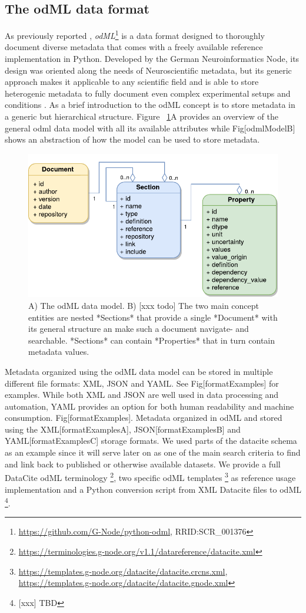 \documentclass{article}
\begin{document}
\subsection{The odML data format}
As previously reported \cite{Grewe_2011}, \textit{odML}\footnote{\url{https://github.com/G-Node/python-odml}, RRID:SCR\_001376} is a data format designed to thoroughly document diverse metadata that comes with a freely available reference implementation in Python. Developed by the German Neuroinformatics Node, its design was oriented along the needs of Neuroscientific metadata, but its generic approach makes it applicable to any scientific field and is able to store heterogenic metadata to fully document even complex experimental setups and conditions \cite{Zehl_2016}.
As a brief introduction to the odML concept is to store metadata in a generic but hierarchical structure. Figure ~\ref{fig:odmlModel}A provides an overview of the general odml data model with all its available attributes while Fig[odmlModelB] shows an abstraction of how the model can be used to store metadata.

\begin{figure}
\begin{center}
\includegraphics[width=0.70\columnwidth]{figures/figOdmlModelA.pdf}
\caption{
A) The odML data model. B) [xxx todo] The two main concept entities are nested *Sections* that provide a single *Document* with its general structure an make such a document navigate- and searchable. *Sections* can contain *Properties* that in turn contain metadata values.
}
\label{fig:odmlModel}
\end{center}
\end{figure}

Metadata organized using the odML data model can be stored in multiple different file formats: XML, JSON and YAML. See Fig[formatExamples] for examples. While both XML and JSON are well used in data processing and automation, YAML provides an option for both human readability and machine consumption.
Fig[formatExamples]. Metadata organized in odML and stored using the XML[formatExamplesA], JSON[formatExamplesB] and YAML[formatExamplesC] storage formats.
We used parts of the datacite schema as an example since it will serve later on as one of the main search criteria to find and link back to published or otherwise available datasets. We provide a full DataCite odML terminology \footnote{\url{https://terminologies.g-node.org/v1.1/datareference/datacite.xml}}, two specific odML templates \footnote{\url{https://templates.g-node.org/datacite/datacite.crcns.xml}, \url{https://templates.g-node.org/datacite/datacite.gnode.xml}} as reference usage implementation and a Python conversion script from XML Datacite files to odML \footnote{[xxx] TBD}.
\end{document}
